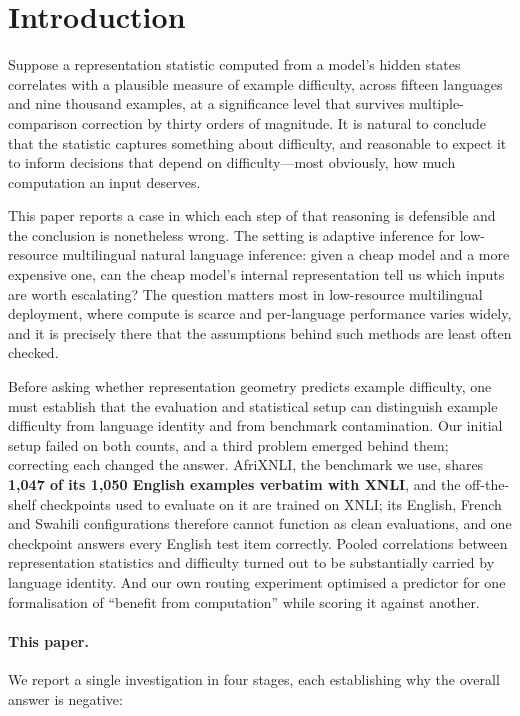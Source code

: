 \documentclass[11pt]{article}
\newcommand{\claim}[1]{#1}   %
\begin{document}
\section{Introduction}
\label{sec:intro}

Suppose a representation statistic computed from a model's hidden states
correlates with a plausible measure of example difficulty, across fifteen
languages and nine thousand examples, at a significance level that survives
multiple-comparison correction by thirty orders of magnitude. It is natural to
conclude that the statistic captures something about difficulty, and reasonable
to expect it to inform decisions that depend on difficulty---most obviously, how
much computation an input deserves.

This paper reports a case in which each step of that reasoning is defensible and
the conclusion is nonetheless wrong. The setting is adaptive inference for
low-resource multilingual natural language inference: given a cheap model and a
more expensive one, can the cheap model's internal representation tell us which
inputs are worth escalating? The question matters most in low-resource
multilingual deployment, where compute is scarce and per-language performance
varies widely, and it is precisely there that the assumptions behind such methods
are least often checked.

\claim{Before asking whether representation geometry predicts example
difficulty, one must establish that the evaluation and statistical setup can
distinguish example difficulty from language identity and from benchmark
contamination.} Our initial setup failed on both counts, and a third problem
emerged behind them; correcting each changed the answer. AfriXNLI, the benchmark we use,
shares \textbf{1{,}047 of its 1{,}050 English examples verbatim with XNLI}, and
the off-the-shelf checkpoints used to evaluate on it are trained on XNLI; its
English, French and Swahili configurations therefore cannot function as clean
evaluations, and one checkpoint answers every English test item correctly.
Pooled correlations between representation statistics and difficulty turned out
to be substantially carried by language identity. And our own routing experiment
optimised a predictor for one formalisation of ``benefit from computation'' while
scoring it against another.

\paragraph{This paper.}
We report a single investigation in four stages, each establishing why the
overall answer is negative:
\end{document}
